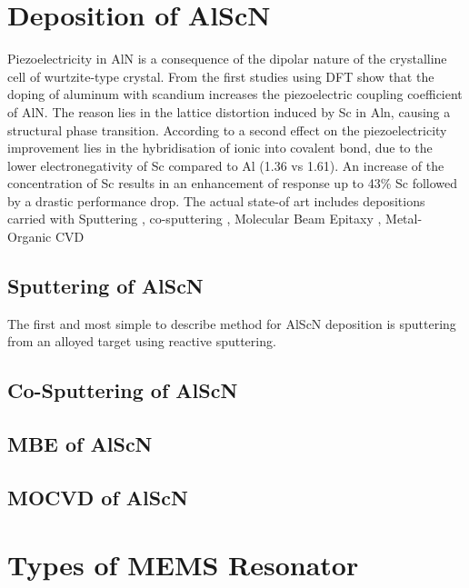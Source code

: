 \section{Deposition of AlScN}
Piezoelectricity in AlN is a consequence of the dipolar nature of the crystalline cell of wurtzite-type crystal. From the first studies using DFT \cite{caro_piezoelectric_2015} \cite{akiyama_enhancement_2009} show that the doping of aluminum with scandium increases the piezoelectric coupling coefficient of AlN. The reason lies in the lattice distortion induced by Sc in Aln, causing a structural phase transition. According to \cite{akiyama_enhancement_2009} a second effect on the piezoelectricity improvement lies in the hybridisation of ionic into covalent bond, due to the lower electronegativity of Sc compared to Al (1.36 vs 1.61). An increase of the concentration of Sc results in an enhancement of response up to 43\% Sc followed by a drastic performance drop. The actual state-of art includes depositions carried with Sputtering \cite{heinz_sputter_2017} \cite{colombo_investigation_2017} \cite{felmetsger_sputter_2019}, co-sputtering \cite{akiyama_enhancement_2009}, Molecular Beam Epitaxy \cite{park_epitaxial_nodate} \cite{casamento_physical_nodate} \cite{hardy_epitaxial_nodate}, Metal-Organic CVD \cite{leone_metal-organic_2020} 

\subsection{Sputtering of AlScN}
The first and most simple to describe method for AlScN deposition is sputtering from an alloyed target using reactive sputtering. 

\subsection{Co-Sputtering of AlScN}

\subsection{MBE of AlScN}

\subsection{MOCVD of AlScN}


\section{Types of MEMS Resonator}
